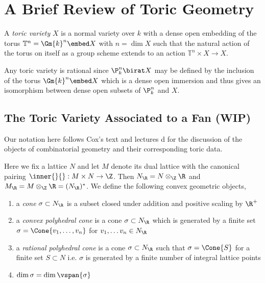 \section{A Brief Review of Toric Geometry}

\renewcommand{\T}{\mathbb{T}}

\begin{defn}
A \textit{toric variety} $X$ is a normal variety over $k$ with a dense open embedding of the torus $\T^n = \Gm{k}^n \embed X$ with $n = \dim{X}$ such that the natural action of the torus on itself as a group scheme extends to an action $\T^n \times X \to X$. 
\end{defn}

\begin{rmk}
Any toric variety is rational since $\P^n_k \birat X$ may be defined by the inclusion of the torus $\Gm{k}^n \embed X$ which is a dense open immersion and thus gives an isomorphism between dense open subsets of $\P^n_k$ and $X$.
\end{rmk}


\subsection{The Toric Variety Associated to a Fan (WIP)}

Our notation here follows Cox's text and lectures d\cite{cox,cox_lectures} for the discussion of the objects of combinatorial geometry and their corresponding toric data.

\begin{defn}
Here we fix a lattice $N$ and let $M$ denote its dual lattice with the canonical pairing $\inner{}{} : M \times N \to \Z$. Then $N_\R = N \otimes_\Z \R$ and $M_\R = M \otimes_\Z \R = (N_\R)^*$. We define the following convex geometric objects,
\begin{enumerate}
\item a \textit{cone} $\sigma \subset N_\R$ is a subset closed under addition and positive scaling by $\R^+$
\item a \textit{convex polyhedral cone} is a cone $\sigma \subset N_\R$ which is generated by a finite set $\sigma = \Cone{v_1, \dots, v_n }$ for $v_1, \dots v_n \in N_\R$
\item a \textit{rational polyhedral cone} is a cone $\sigma \subset N_\R$ such that $\sigma = \Cone{S}$ for a finite set $S \subset N$ i.e. $\sigma$ is generated by a finite number of integral lattice points
\item $\dim{\sigma} = \dim{\vspan{\sigma}}$
\end{enumerate}
\end{defn}

